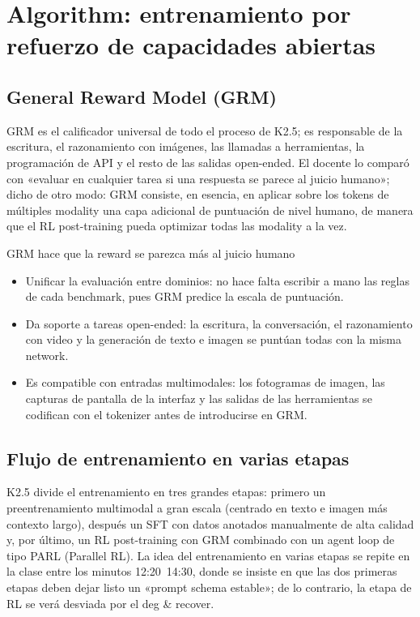 \documentclass[a4paper]{article}
\begin{document}
\section{Algorithm: entrenamiento por refuerzo de capacidades abiertas}

\subsection{General Reward Model (GRM)}
GRM es el calificador universal de todo el proceso de K2.5; es responsable de la escritura, el razonamiento con imágenes, las llamadas a herramientas, la programación de API y el resto de las salidas open-ended. El docente lo comparó con «evaluar en cualquier tarea si una respuesta se parece al juicio humano»; dicho de otro modo: GRM consiste, en esencia, en aplicar sobre los tokens de múltiples modality una capa adicional de puntuación de nivel humano, de manera que el RL post-training pueda optimizar todas las modality a la vez.

\begin{knowledgebox}{GRM hace que la reward se parezca más al juicio humano}
\begin{itemize}
    \item Unificar la evaluación entre dominios: no hace falta escribir a mano las reglas de cada benchmark, pues GRM predice la escala de puntuación.
    \item Da soporte a tareas open-ended: la escritura, la conversación, el razonamiento con video y la generación de texto e imagen se puntúan todas con la misma network.
    \item Es compatible con entradas multimodales: los fotogramas de imagen, las capturas de pantalla de la interfaz y las salidas de las herramientas se codifican con el tokenizer antes de introducirse en GRM.
\end{itemize}
\end{knowledgebox}

\subsection{Flujo de entrenamiento en varias etapas}
K2.5 divide el entrenamiento en tres grandes etapas: primero un preentrenamiento multimodal a gran escala (centrado en texto e imagen más contexto largo), después un SFT con datos anotados manualmente de alta calidad y, por último, un RL post-training con GRM combinado con un agent loop de tipo PARL (Parallel RL). La idea del entrenamiento en varias etapas se repite en la clase entre los minutos 12:20~14:30, donde se insiste en que las dos primeras etapas deben dejar listo un «prompt schema estable»; de lo contrario, la etapa de RL se verá desviada por el deg \& recover.
\end{document}
